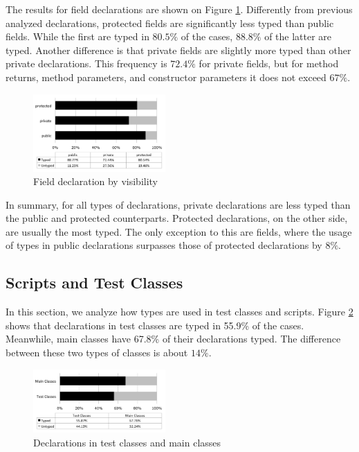 \documentclass[preprint]{sigplanconf}
\begin{document}
The results for field declarations are shown on Figure \ref{fig:field_visibility}. 
Differently from previous analyzed declarations, protected fields are significantly less typed than public fields. 
While the first are typed in $80.5\%$ of the cases, $88.8\%$ of the latter are typed.
Another difference is that private fields are slightly more typed than other private declarations.
This frequency is $72.4\%$ for private fields, but for method returns, method parameters, and constructor parameters it does not exceed $67\%$.


\begin{figure}[h]
\centering \includegraphics[width=0.45\textwidth]{field_visibility} 
\caption{Field declaration by visibility}
\label{fig:field_visibility} 
\end{figure}

In summary, for all types of declarations, private declarations are less typed than the public and protected counterparts.
Protected declarations, on the other side, are usually the most typed. The only exception to this are fields, where the usage of types in public declarations surpasses those of protected declarations by $8\%$.

\subsection{Scripts and Test Classes\label{res-test-scripts}}
In this section, we analyze how types are used in test classes and scripts.
Figure \ref{fig:test_classes} shows that declarations in test classes are typed in 55.9\% of the cases.
Meanwhile, main classes have 67.8\% of their declarations typed.
The difference between these two types of classes is about $14\%$.

\begin{figure}[ht]
\centering \includegraphics[width=0.45\textwidth]{test_classes} 
\caption{Declarations in test classes and main classes}
\label{fig:test_classes} 
\end{figure}
\end{document}
